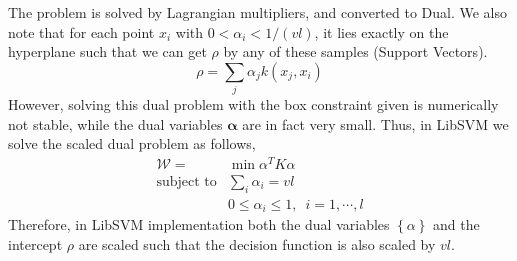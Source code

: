 \documentclass{llncs}
\newcommand{\vct}[1]{\ensuremath{\boldsymbol{#1}}} %
\newcommand{\set}[1]{\ensuremath{\mathcal{#1}}}
\newcommand{\argmin}{\operatornamewithlimits{\arg\,\min}}
\begin{document}
	The problem is solved by Lagrangian multipliers, and converted to Dual. We also note that for each point $x_i$ with $0<\alpha_i<1/\left(vl\right)$,
	it lies exactly on the hyperplane such that we can get $\rho$ by any of these samples (Support Vectors).
	\begin{equation}
		\rho = \sum_j \alpha_jk\left(x_j, x_i\right)
	\end{equation}
	However, solving this dual problem with the box constraint given is numerically not stable, while the dual variables $\vct{\alpha}$ are in fact very small. Thus, in LibSVM\cite{libsvm} we solve the scaled dual problem as follows,
	\begin{eqnarray}
		\set W = & \min  \alpha^T K \alpha \\
		\text{subject to} &  \sum_i\alpha_i = vl \nonumber \\ 
		& 0 \leq \alpha_i \leq 1, \,\,\, i=1,\cdots, l \nonumber
	\end{eqnarray}
	Therefore, in LibSVM implementation both the dual variables $\left\lbrace\alpha\right\rbrace$ and the intercept $\rho$ are scaled such that the decision function is also scaled by $vl$.  
	
\end{document}
